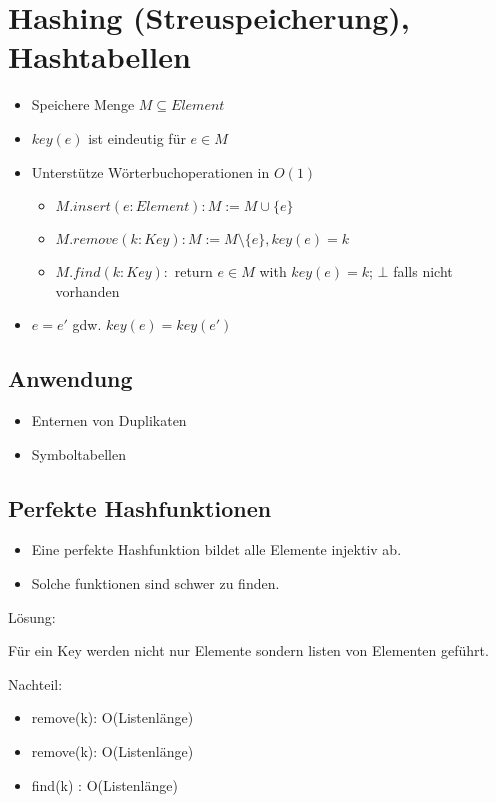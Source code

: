 \section{Hashing (Streuspeicherung), Hashtabellen}
\begin{itemize}
    \item Speichere Menge $M \subseteq Element$
    \item $key(e)$ ist eindeutig für $e \in M$
    \item Unterstütze Wörterbuchoperationen in $O(1)$
    \begin{itemize}
        \item $M.insert(e : Element): M := M \cup \{e\}$
        \item $M.remove(k: Key): M := M \setminus \{e\}, key(e) = k$
        \item $M.find(k: Key):$ return $e \in M$ with $key(e)=k$; $\bot$ falls nicht vorhanden
    \end{itemize}
    \item $e = e'$ gdw. $key(e) = key(e')$
\end{itemize}

\subsection{Anwendung}
\begin{itemize}
    \item Enternen von Duplikaten
    \item Symboltabellen
\end{itemize}

\subsection{Perfekte Hashfunktionen}
\begin{itemize}
    \item Eine perfekte Hashfunktion bildet alle Elemente injektiv ab.
    \item Solche funktionen sind schwer zu finden.
\end{itemize}
Lösung:

Für ein Key werden nicht nur Elemente sondern listen von Elementen geführt.


Nachteil:
\begin{itemize}
    \item remove(k): O(Listenlänge)
    \item remove(k): O(Listenlänge)
    \item find(k) : O(Listenlänge)
\end{itemize}

